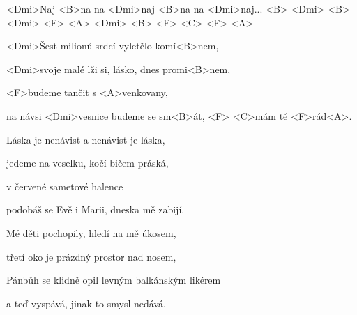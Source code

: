 
\zr

<Dmi>Naj <B>na na <Dmi>naj <B>na na <Dmi>naj... 
 <B> <Dmi> <B> <Dmi> <F> <A> <Dmi> 
 <B> <F> <C> <F> <A> 

\kr
\zs

<Dmi>Šest milionů srdcí vyletělo komí<B>nem,

<Dmi>svoje malé lži si, lásko, dnes promi<B>nem,

<F>budeme tančit s <A>venkovany,

na návsi <Dmi>vesnice budeme se sm<B>át, <F> <C>mám tě <F>rád<A>.

\ks

\zr \kr

\zs

Láska je nenávist a nenávist je láska,

jedeme na veselku, kočí bičem práská,

v červené sametové halence

podobáš se Evě i Marii, dneska mě zabijí.

\ks

\zr \kr

\zs

Mé děti pochopily, hledí na mě úkosem,

třetí oko je prázdný prostor nad nosem,

Pánbůh se klidně opil levným balkánským likérem

a teď vyspává, jinak to smysl nedává.

\ks

\zr
\kr

\kp

